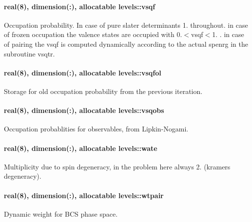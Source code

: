 \paragraph[{\texorpdfstring{vsqf}{vsqf}}]{\setlength{\rightskip}{0pt plus 5cm}real(8), dimension(\+:), allocatable levels\+::vsqf}\hypertarget{namespacelevels_a99f8fedba7473412f8f1bc3cbc607cd0}{}\label{namespacelevels_a99f8fedba7473412f8f1bc3cbc607cd0}


Occupation probability. In case of pure slater determinants 1. throughout. in case of frozen occupation the valence states are occupied with 0.$<$vsqf$<$1. . in case of pairing the {\ttfamily vsqf} is computed dynamically according to the actual {\ttfamily spenrg} in the subroutine {\ttfamily vsqtr}. 

\paragraph[{\texorpdfstring{vsqfol}{vsqfol}}]{\setlength{\rightskip}{0pt plus 5cm}real(8), dimension(\+:), allocatable levels\+::vsqfol}\hypertarget{namespacelevels_aef67aed951be3f696e628e652092e968}{}\label{namespacelevels_aef67aed951be3f696e628e652092e968}


Storage for old occupation probability from the previous iteration. 

\paragraph[{\texorpdfstring{vsqobs}{vsqobs}}]{\setlength{\rightskip}{0pt plus 5cm}real(8), dimension(\+:), allocatable levels\+::vsqobs}\hypertarget{namespacelevels_abac62079bff1cfcbd28b41bf5f080083}{}\label{namespacelevels_abac62079bff1cfcbd28b41bf5f080083}


Occupation probablities for observables, from Lipkin-\/\+Nogami. 

\paragraph[{\texorpdfstring{wate}{wate}}]{\setlength{\rightskip}{0pt plus 5cm}real(8), dimension(\+:), allocatable levels\+::wate}\hypertarget{namespacelevels_aeb60866d99b0237db54cd7bb0d04eb81}{}\label{namespacelevels_aeb60866d99b0237db54cd7bb0d04eb81}


Multiplicity due to spin degeneracy, in the problem here always 2. (kramers degeneracy). 

\paragraph[{\texorpdfstring{wtpair}{wtpair}}]{\setlength{\rightskip}{0pt plus 5cm}real(8), dimension(\+:), allocatable levels\+::wtpair}\hypertarget{namespacelevels_a9e4827753c29903f6526f3426d768585}{}\label{namespacelevels_a9e4827753c29903f6526f3426d768585}


Dynamic weight for B\+CS phase space. 

